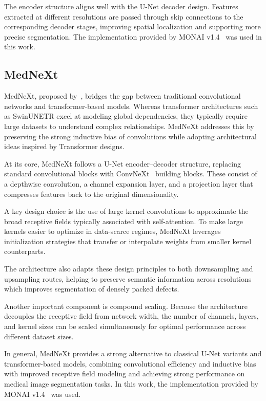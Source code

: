 The encoder structure aligns well with the U-Net decoder design. Features extracted at different resolutions are passed through skip connections to the corresponding decoder stages, improving spatial localization and supporting more precise segmentation. The implementation provided by MONAI v1.4~\cite{cardoso2022monai} was used in this work.

\subsection{MedNeXt}
MedNeXt, proposed by~\cite{roy2023mednext}, bridges the gap between traditional convolutional networks and transformer-based models. Whereas transformer architectures such as SwinUNETR excel at modeling global dependencies, they typically require large datasets to understand complex relationships. MedNeXt addresses this by preserving the strong inductive bias of convolutions while adopting architectural ideas inspired by Transformer designs.

At its core, MedNeXt follows a U-Net encoder–decoder structure, replacing standard convolutional blocks with ConvNeXt~\cite{woo2023convnextv2} building blocks. These consist of a depthwise convolution, a channel expansion layer, and a projection layer that compresses features back to the original dimensionality.

A key design choice is the use of large kernel convolutions to approximate the broad receptive fields typically associated with self-attention. To make large kernels easier to optimize in data-scarce regimes, MedNeXt leverages initialization strategies that transfer or interpolate weights from smaller kernel counterparts.

The architecture also adapts these design principles to both downsampling and upsampling routes, helping to preserve semantic information across resolutions which improves segmentation of densely packed defects.

Another important component is compound scaling. Because the architecture decouples the receptive field from network width, the number of channels, layers, and kernel sizes can be scaled simultaneously for optimal performance across different dataset sizes.

In general, MedNeXt provides a strong alternative to classical U-Net variants and transformer-based models, combining convolutional efficiency and inductive bias with improved receptive field modeling and achieving strong performance on medical image segmentation tasks. In this work, the implementation provided by MONAI v1.4~\cite{cardoso2022monai} was used.


